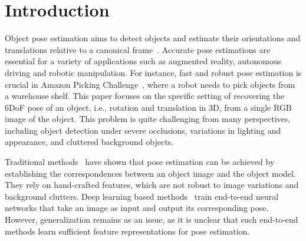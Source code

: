 \documentclass[10pt,twocolumn,letterpaper]{article}
\begin{document}
\section{Introduction}%

Object pose estimation aims to detect objects and estimate their orientations and translations relative to a canonical frame~\cite{xiang2014beyond}. Accurate pose estimations are essential for a variety of applications such as augmented reality, autonomous driving and robotic manipulation. For instance, fast and robust pose estimation is crucial in Amazon Picking Challenge~\cite{correll2018analysis}, where a robot needs to pick objects from a warehouse shelf. This paper focuses on the specific setting of recovering the 6DoF pose of an object, i.e., rotation and translation in 3D, from a single RGB image of the object. This problem is quite challenging from many perspectives, including object detection under severe occlusions, variations in lighting and appearance, and cluttered background objects.


Traditional methods~\cite{lowe1999object,lepetit2005monocular,hinterstoisser2012model} have shown that pose estimation can be achieved by establishing the correspondences between an object image and the object model. They rely on hand-crafted features, which are not robust to image variations and background clutters. Deep learning based methods~\cite{su2015render, kehl2017ssd, xiang2017posecnn, bui2018regression} train end-to-end neural networks that take an image as input and output its corresponding pose. However, generalization remains as an issue, as it is unclear that such end-to-end methods learn sufficient feature representations for pose estimation.  
\end{document}

